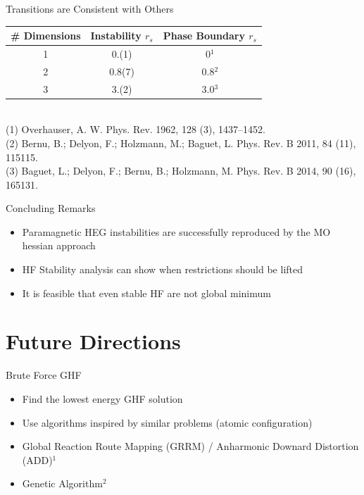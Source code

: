 \documentclass[10pt]{beamer}
\begin{document}
{{{{{{{{{{{{{%
\begin{frame}{Transitions are Consistent with Others}
  \centering
  \begin{tabular}{ c | c | c } 
  \# Dimensions & Instability $r_s$ & Phase Boundary $r_s$ \\
  \hline
  1 & 0.(1) & 0$^1$ \\ 
  2 & 0.8(7)  & 0.8$^2$ \\ 
  3 & 3.(2)  & 3.0$^3$ \\ 
  \end{tabular}\\
  \vspace{5mm}
  \scriptsize
  (1) Overhauser, A. W. Phys. Rev. 1962, 128 (3), 1437–1452. \\
  (2) Bernu, B.; Delyon, F.; Holzmann, M.; Baguet, L. Phys. Rev. B 2011, 84 (11), 115115.\\
  (3) Baguet, L.; Delyon, F.; Bernu, B.; Holzmann, M. Phys. Rev. B 2014, 90 (16), 165131.
\end{frame}


\begin{frame}{Concluding Remarks}
  \begin{itemize}
    \item{ Paramagnetic HEG instabilities are successfully reproduced by the MO hessian approach }
    \item{ HF Stability analysis can show when restrictions should be lifted }
    \item{ It is feasible that even stable HF are not global minimum }
  \end{itemize}
\end{frame}

\section{Future Directions}

\begin{frame}{Brute Force GHF}
	\begin{itemize}[<+->]
  	\item Find the lowest energy GHF solution 
  	\item Use algorithms inspired by similar problems (atomic configuration)
  	\item Global Reaction Route Mapping (GRRM) / Anharmonic Downard Distortion (ADD)$^1$
  	\item Genetic Algorithm$^2$
	\end{itemize}
\end{frame}

}}}}}}}}}}}}}
\end{document}

